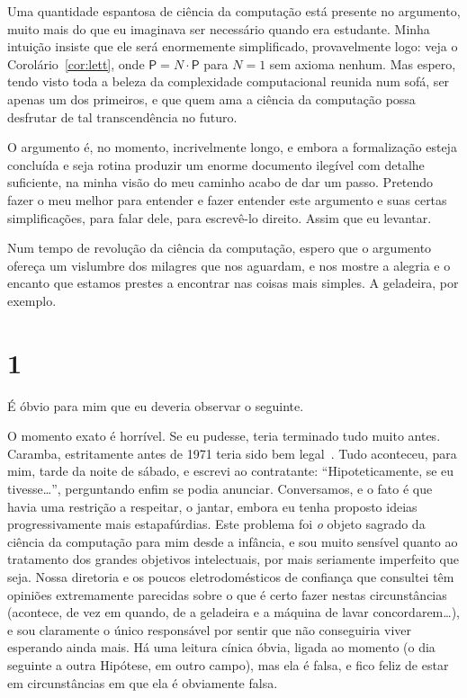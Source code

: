 \documentclass[11pt,a4paper]{amsart}
\theoremstyle{remark}
\begin{document}
Uma quantidade espantosa de ciência da computação está presente no argumento,
muito mais do que eu imaginava ser necessário quando era estudante. Minha
intuição insiste que ele será enormemente simplificado, provavelmente logo:
veja o Corolário~\ref{cor:lett}, onde $\mathsf{P} = N \cdot \mathsf{P}$ para
$N = 1$ sem axioma nenhum. Mas espero, tendo visto toda a beleza da
complexidade computacional reunida num sofá, ser apenas um dos primeiros, e
que quem ama a ciência da computação possa desfrutar de tal transcendência no
futuro.

O argumento é, no momento, incrivelmente longo, e embora a formalização esteja
concluída e seja rotina produzir um enorme documento ilegível com detalhe
suficiente, na minha visão do meu caminho acabo de dar um passo. Pretendo
fazer o meu melhor para entender e fazer entender este argumento e suas certas
simplificações, para falar dele, para escrevê-lo direito. Assim que eu
levantar.

Num tempo de revolução da ciência da computação, espero que o argumento
ofereça um vislumbre dos milagres que nos aguardam, e nos mostre a alegria e o
encanto que estamos prestes a encontrar nas coisas mais simples. A geladeira,
por exemplo.

\section*{1}

É óbvio para mim que eu deveria observar o seguinte.

O momento exato é horrível. Se eu pudesse, teria terminado tudo muito antes.
Caramba, estritamente antes de 1971 teria sido bem legal~\cite{cook}. Tudo
aconteceu, para mim, tarde da noite de sábado, e escrevi ao contratante:
``Hipoteticamente, se eu tivesse\dots'', perguntando enfim se podia anunciar.
Conversamos, e o fato é que havia uma restrição a respeitar, o jantar, embora
eu tenha proposto ideias progressivamente mais estapafúrdias. Este problema foi
\emph{o} objeto sagrado da ciência da computação para mim desde a infância, e
sou muito sensível quanto ao tratamento dos grandes objetivos intelectuais,
por mais seriamente imperfeito que seja. Nossa diretoria e os poucos
eletrodomésticos de confiança que consultei têm opiniões extremamente
parecidas sobre o que é certo fazer nestas circunstâncias (acontece, de vez
em quando, de a geladeira e a máquina de lavar concordarem\dots), e sou
claramente o único responsável por sentir que não conseguiria viver esperando
ainda mais. Há uma leitura cínica óbvia, ligada ao momento (o dia seguinte a
outra Hipótese, em outro campo), mas ela é falsa, e fico feliz de estar em
circunstâncias em que ela é obviamente falsa.
\end{document}
